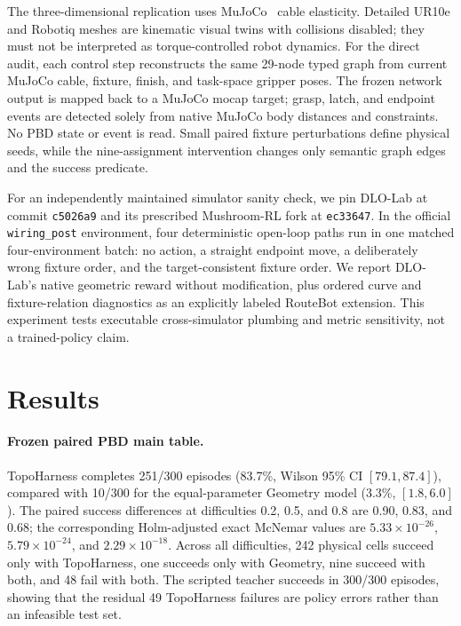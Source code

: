 \documentclass[journal]{IEEEtran}
\begin{document}
The three-dimensional replication uses MuJoCo~\cite{todorov2012mujoco} cable
elasticity.  Detailed UR10e and Robotiq meshes are kinematic visual twins with
collisions disabled; they must not be interpreted as torque-controlled robot
dynamics.  For the direct audit, each control step reconstructs the same
29-node typed graph from current MuJoCo cable, fixture, finish, and task-space
gripper poses.  The frozen network output is mapped back to a MuJoCo mocap
target; grasp, latch, and endpoint events are detected solely from native
MuJoCo body distances and constraints.  No PBD state or event is read.  Small
paired fixture perturbations define physical seeds, while the nine-assignment
intervention changes only semantic graph edges and the success predicate.

For an independently maintained simulator sanity check, we pin DLO-Lab at
commit \texttt{c5026a9} and its prescribed Mushroom-RL fork at
\texttt{ec33647}.  In the official \texttt{wiring\_post} environment, four
deterministic open-loop paths run in one matched four-environment batch: no
action, a straight endpoint move, a deliberately wrong fixture order, and the
target-consistent fixture order.  We report DLO-Lab's native geometric reward
without modification, plus ordered curve and fixture-relation diagnostics as
an explicitly labeled RouteBot extension.  This experiment tests executable
cross-simulator plumbing and metric sensitivity, not a trained-policy claim.

\section{Results}

\begin{table}[t]
  \centering
  \caption{Paired RouteBot results over all frozen difficulties. Semantic
  success is primary; crossing-free success is the strict 2-D shape metric.}
  \label{tab:main}
    {{\small\setlength{\tabcolsep}{2.5pt}%
      }}
    {}
\end{table}

\paragraph{Frozen paired PBD main table.}
TopoHarness completes 251/300 episodes (83.7\%, Wilson 95\% CI
$[79.1,87.4]$), compared with 10/300 for the equal-parameter Geometry model
(3.3\%, $[1.8,6.0]$).  The paired success differences at difficulties 0.2,
0.5, and 0.8 are 0.90, 0.83, and 0.68; the corresponding Holm-adjusted exact
McNemar values are $5.33\times10^{-26}$, $5.79\times10^{-24}$, and
$2.29\times10^{-18}$.  Across all difficulties, 242 physical cells succeed only
with TopoHarness, one succeeds only with Geometry, nine succeed with both, and
48 fail with both.  The scripted teacher succeeds in 300/300 episodes, showing
that the residual 49 TopoHarness failures are policy errors rather than an
infeasible test set.
\end{document}
